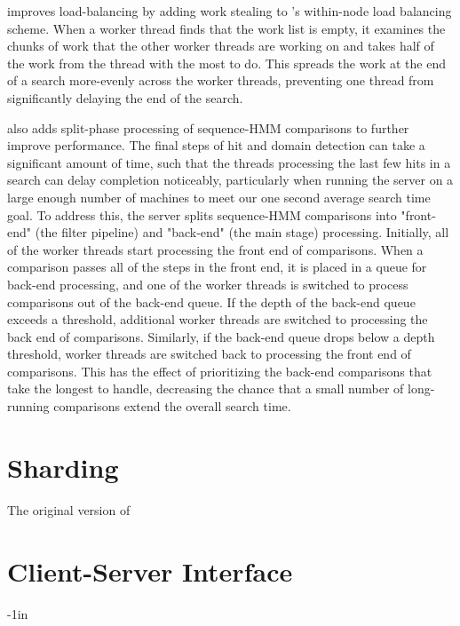 \documentclass[notoc,justified,openany]{tufte-book}    %
\newcommand{\Hmmserver}{\mono{Hmmserver}\xspace}
\newcommand{\hmmpgmd}{\mono{hmmpgmd}\xspace}
\begin{document}
\begin{itemize}
\Hmmserver improves load-balancing by adding work stealing to \hmmpgmd's within-node load balancing scheme.  When a worker thread finds that the work list is empty, it examines the chunks of work that the other worker threads are working on and takes half of the work from the thread with the most to do.  This spreads the work at the end of a search more-evenly across the worker threads, preventing one thread from significantly delaying the end of the search.

\Hmmserver also adds split-phase processing of sequence-HMM comparisons to further improve performance.  The final steps of hit and domain detection can take a significant amount of time, such that the threads processing the last few hits in a search can delay completion noticeably, particularly when running the server on a large enough number of machines to meet our one second average search time goal.  To address this, the server splits sequence-HMM comparisons into "front-end" (the filter pipeline) and "back-end" (the main stage) processing.  Initially, all of the worker threads start processing the front end of comparisons.  When a comparison passes all of the steps in the front end, it is placed in a queue for back-end processing, and one of the worker threads is switched to process comparisons out of the back-end queue.  If the depth of the back-end queue exceeds a threshold, additional worker threads are switched to processing the back end of comparisons.  Similarly, if the back-end queue drops below a depth threshold, worker threads are switched back to processing the front end of comparisons.  This has the effect of prioritizing the back-end comparisons that take the longest to handle, decreasing the chance that a small number of long-running comparisons extend the overall search time.


\section{Sharding}
The original version of \hmmpgmd 

\section{Client-Server Interface}

\begin{adjustwidth}{}{-1in}   

\end{adjustwidth}
\end{itemize}
\end{document}
